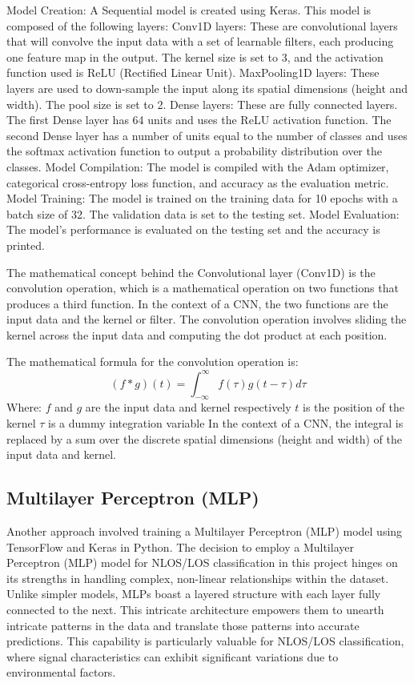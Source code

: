 \documentclass[
	a4paper, %
	11pt, %
]{CSUniSchoolLabReport}
\begin{document}

Model Creation: A Sequential model is created using Keras. This model is composed of the following layers: 
Conv1D layers: These are convolutional layers that will convolve the input data with a set of learnable filters, each producing one feature map in the output. The kernel size is set to 3, and the activation function used is ReLU (Rectified Linear Unit).  
MaxPooling1D layers: These layers are used to down-sample the input along its spatial dimensions (height and width). The pool size is set to 2.  
Dense layers: These are fully connected layers. The first Dense layer has 64 units and uses the ReLU activation function. The second Dense layer has a number of units equal to the number of classes and uses the softmax activation function to output a probability distribution over the classes.  
Model Compilation: The model is compiled with the Adam optimizer, categorical cross-entropy loss function, and accuracy as the evaluation metric.  
Model Training: The model is trained on the training data for 10 epochs with a batch size of 32. The validation data is set to the testing set.  
Model Evaluation: The model's performance is evaluated on the testing set and the accuracy is printed.  

The mathematical concept behind the Convolutional layer (Conv1D) is the convolution operation, which is a mathematical operation on two functions that produces a third function. In the context of a CNN, the two functions are the input data and the kernel or filter. The convolution operation involves sliding the kernel across the input data and computing the dot product at each position.

The mathematical formula for the convolution operation is:  $$ (f * g)(t) = \int_{-\infty}^{\infty} f(\tau)g(t - \tau) d\tau $$  Where:  
$f$ and $g$ are the input data and kernel respectively
$t$ is the position of the kernel
$\tau$ is a dummy integration variable
In the context of a CNN, the integral is replaced by a sum over the discrete spatial dimensions (height and width) of the input data and kernel.


\subsection{Multilayer Perceptron (MLP)}\label{mlp}                                                                                                         
Another approach involved training a Multilayer Perceptron (MLP) model using TensorFlow and Keras in Python. The decision to employ a Multilayer Perceptron (MLP) model for NLOS/LOS classification in this project hinges on its strengths in handling complex, non-linear relationships within the dataset. Unlike simpler models, MLPs boast a layered structure with each layer fully connected to the next. This intricate architecture empowers them to unearth intricate patterns in the data and translate those patterns into accurate predictions. This capability is particularly valuable for NLOS/LOS classification, where signal characteristics can exhibit significant variations due to environmental factors.
\end{document}
